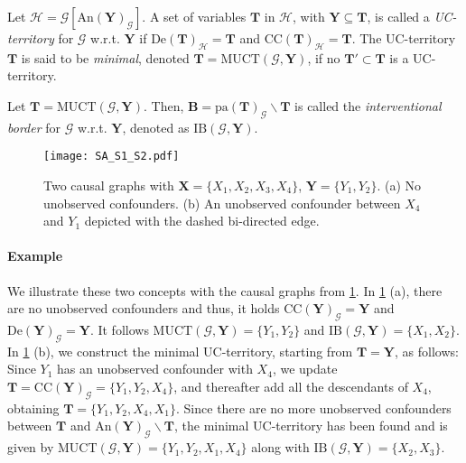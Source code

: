 \begin{definition}
    \label{def:mo_cbo.uc_territory}
    Let $\mathcal{H}=\mathcal{G}[\text{An}(\mathbf{Y})_{\mathcal{G}}]$. A set of variables $\mathbf{T}$ in $\mathcal{H}$, with $\mathbf{Y} \subseteq \mathbf{T}$, is called a \textit{UC-territory} for $\mathcal{G}$ w.r.t. $\mathbf{Y}$ if $\text{De}(\mathbf{T})_{\mathcal{H}}=\mathbf{T}$ and $\text{CC}(\mathbf{T})_{\mathcal{H}} = \mathbf{T}$. The UC-territory $\mathbf{T}$ is said to be \textit{minimal}, denoted $\mathbf{T} = \text{MUCT}(\mathcal{G},\mathbf{Y})$, if no $\mathbf{T}' \subset \mathbf{T}$ is a UC-territory.
\end{definition}

\begin{definition}
    \label{def:mo_cbo.int_border}
    Let $\mathbf{T}=\text{MUCT}(\mathcal{G},\mathbf{Y})$. Then, $\mathbf{B} = \text{pa}(\mathbf{T})_{\mathcal{G}} \backslash \mathbf{T}$ is called the \textit{interventional border} for $\mathcal{G}$ w.r.t. $\mathbf{Y}$, denoted as $\text{IB}(\mathcal{G},\mathbf{Y})$.
\end{definition}

\begin{figure}[t]
    \centering
    \texttt{[image: SA\_S1\_S2.pdf]}
    \caption{Two causal graphs with $\mathbf{X}=\{ X_1,X_2,X_3,X_4\}$, $\mathbf{Y}=\{Y_1,Y_2\}$. (a) No unobserved confounders. (b) An unobserved confounder between $X_4$ and $Y_1$ depicted with the dashed bi-directed edge.}
    \label{fig:synthtic_dags}
\end{figure}

\paragraph{Example} We illustrate these two concepts with the causal graphs from \cref{fig:synthtic_dags}. In \cref{fig:synthtic_dags} (a), there are no unobserved confounders and thus, it holds $\text{CC}(\mathbf{Y})_{\mathcal{G}} = \mathbf{Y}$ and $\text{De}(\mathbf{Y})_{\mathcal{G}} = \mathbf{Y}$. 
It follows $\text{MUCT}(\mathcal{G},\mathbf{Y}) = \{ Y_1,Y_2\}$ and $\text{IB}(\mathcal{G},\mathbf{Y})=\{X_1,X_2\}$. In \cref{fig:synthtic_dags} (b), we construct the minimal UC-territory, starting from $\mathbf{T}=\mathbf{Y}$,  as follows: 
Since $Y_1$ has an unobserved confounder with $X_4$, we update $\mathbf{T} = \text{CC}(\mathbf{Y})_{\mathcal{G}} = \{ Y_1,Y_2,X_4\}$, and thereafter add all the descendants of $X_4$, obtaining $\mathbf{T} = \{Y_1,Y_2,X_4,X_1\}$. 
Since there are no more unobserved confounders between $\mathbf{T}$ and $\text{An}(\mathbf{Y})_{\mathcal{G}} \backslash \mathbf{T}$, the minimal UC-territory has been found and is given by $\text{MUCT}(\mathcal{G},\mathbf{Y}) = \{ Y_1,Y_2, X_1, X_4\}$ along with $\text{IB}(\mathcal{G},\mathbf{Y})=\{X_2,X_3\}$. 


